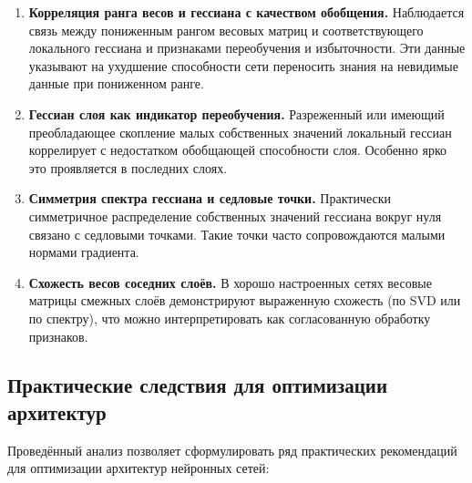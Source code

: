 \documentclass[a4paper,12pt]{article}
\begin{document}
\begin{enumerate}
  \item \textbf{Корреляция ранга весов и гессиана с качеством обобщения.} Наблюдается связь между пониженным рангом
    весовых матриц и соответствующего локального гессиана и признаками переобучения и избыточности. Эти данные
    указывают на ухудшение способности сети переносить знания на невидимые данные при пониженном ранге.
  \item \textbf{Гессиан слоя как индикатор переобучения.} Разреженный или имеющий преобладающее скопление
    малых собственных значений локальный гессиан коррелирует с недостатком обобщающей способности
    слоя. Особенно ярко это проявляется в последних слоях.
  \item \textbf{Симметрия спектра гессиана и седловые точки.} Практически симметричное распределение
    собственных значений гессиана вокруг нуля связано с седловыми точками. Такие точки часто
    сопровождаются малыми нормами градиента.
  \item \textbf{Схожесть весов соседних слоёв.} В хорошо настроенных сетях весовые матрицы смежных слоёв
    демонстрируют выраженную схожесть (по SVD или по спектру), что можно интерпретировать как согласованную
    обработку признаков.
\end{enumerate}

\subsection{Практические следствия для оптимизации архитектур}

Проведённый анализ позволяет сформулировать ряд практических рекомендаций для оптимизации архитектур нейронных сетей:
\end{document}
